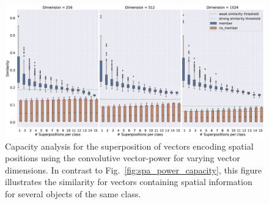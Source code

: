 \begin{figure}[t]
    \centering
    \includegraphics[width=0.95\linewidth]{imgs/spa_power_capacity_superpositions_per_class.eps}
    \caption{Capacity analysis for the superposition of vectors encoding spatial positions using the convolutive vector-power for varying vector dimensions.
        In contrast to Fig.~\ref{fig:spa_power_capacity}, this figure illustrates the similarity for vectors containing spatial information for several objects of the same class.
    }
    \label{fig:spa_power_capacity_superpositions_per_class}
\end{figure}

